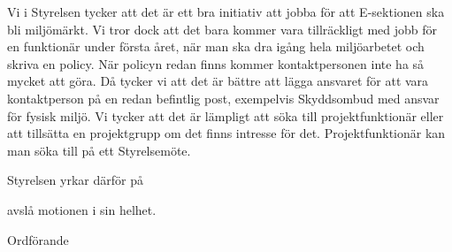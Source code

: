 \documentclass[../_main/handlingar.tex]{subfiles}
\begin{document}
\motionssvar
Vi i Styrelsen tycker att det är ett bra initiativ att jobba för att E-sektionen ska bli miljömärkt. Vi tror dock att det bara kommer vara tillräckligt med jobb för en funktionär under första året, när man ska dra igång hela miljöarbetet och skriva en policy. När policyn redan finns kommer kontaktpersonen inte ha så mycket att göra. Då tycker vi att det är bättre att lägga ansvaret för att vara kontaktperson på en redan befintlig post, exempelvis Skyddsombud med ansvar för fysisk miljö. Vi tycker att det är lämpligt att söka till projektfunktionär eller att tillsätta en projektgrupp om det finns intresse för det. Projektfunktionär kan man söka till på ett Styrelsemöte. 

Styrelsen yrkar därför på

\begin{attsatser}
    \att avslå motionen i sin helhet.
\end{attsatser}


\begin{signatures}{1}
	\ist
	\signature{Daniel Bakic}{Ordförande}
\end{signatures}
\end{document}
